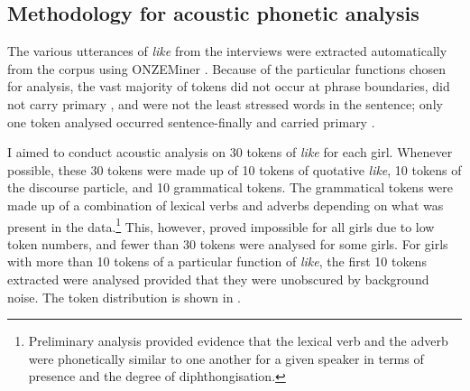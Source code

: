 \subsection{Methodology for acoustic phonetic analysis}\label{sec:phoneticmethod}


The various utterances of \textit{like} from the interviews were extracted automatically from the corpus using ONZEMiner \citep{onzeminer}. Because of the particular functions chosen for analysis, the vast majority of tokens did not occur at phrase boundaries, did not carry primary , and were not the least stressed words in the sentence; only one token analysed occurred sentence-finally and carried primary . 

I aimed to conduct acoustic analysis on 30 tokens of \textit{like} for each girl. Whenever possible, these 30 tokens were made up of 10 tokens of quotative \textit{like}, 10 tokens of the discourse particle, and 10 grammatical tokens. The grammatical tokens were made up of a combination of lexical verbs and adverbs depending on what was present in the data.\footnote{Preliminary analysis provided evidence that the lexical verb and the adverb were phonetically similar to one another for a given speaker in terms of  presence and the degree of diphthongisation.} This, however, proved impossible for all girls due to low token numbers, and fewer than 30 tokens were analysed for some girls. For girls with more than 10 tokens of a particular function of \textit{like}, the first 10 tokens extracted were analysed provided that they were unobscured by background noise. The token distribution is shown in .

 
        
